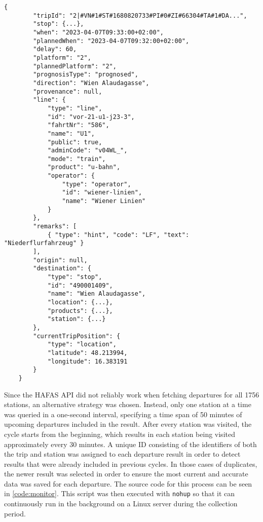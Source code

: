 \begin{lstlisting}[caption={A \texttt{departure} object returned by the \ac{HAFAS} \ac{API}}, label={code:departures-res}]
	{
		"tripId": "2|#VN#1#ST#1680820733#PI#0#ZI#66304#TA#1#DA...",
		"stop": {...},
		"when": "2023-04-07T09:33:00+02:00",
		"plannedWhen": "2023-04-07T09:32:00+02:00",
		"delay": 60,
		"platform": "2",
		"plannedPlatform": "2",
		"prognosisType": "prognosed",
		"direction": "Wien Alaudagasse",
		"provenance": null,
		"line": {
			"type": "line",
			"id": "vor-21-u1-j23-3",
			"fahrtNr": "586",
			"name": "U1",
			"public": true,
			"adminCode": "v04WL_",
			"mode": "train",
			"product": "u-bahn",
			"operator": {
				"type": "operator",
				"id": "wiener-linien",
				"name": "Wiener Linien"
			}
		},
		"remarks": [
			{ "type": "hint", "code": "LF", "text": "Niederflurfahrzeug" }
		],
		"origin": null,
		"destination": {
			"type": "stop",
			"id": "490001409",
			"name": "Wien Alaudagasse",
			"location": {...},
			"products": {...},
			"station": {...}
		},
		"currentTripPosition": {
			"type": "location",
			"latitude": 48.213994,
			"longitude": 16.383191
		}
	}
\end{lstlisting}

Since the \ac{HAFAS} \ac{API} did not reliably work when fetching departures for all 1756 stations, an alternative strategy was chosen. Instead, only one station at a time was queried in a one-second interval, specifying a time span of 50 minutes of upcoming departures included in the result. After every station was visited, the cycle starts from the beginning, which results in each station being visited approximately every 30 minutes. A unique ID consisting of the identifiers of both the trip and station was assigned to each departure result in order to detect results that were already included in previous cycles. In those cases of duplicates, the newer result was selected in order to ensure the most current and accurate data was saved for each departure. The source code for this process can be seen in \cref{code:monitor}. This script was then executed with \texttt{nohup} so that it can continuously run in the background on a Linux server during the collection period.

